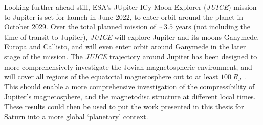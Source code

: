 Looking further ahead still, ESA's JUpiter ICy Moon Explorer (\textit{JUICE}) mission to Jupiter \citep{grasset2013} is set for launch in June 2022, to enter orbit  around the planet in October 2029. Over the total planned mission of ${\sim}3.5$ years (not including the time of  transit to Jupiter), \textit{JUICE} will explore Jupiter and its moons Ganymede, Europa and Callisto, and will even enter orbit around Ganymede in the later stage of the mission. The \textit{JUICE} trajectory around Jupiter has been designed to more comprehensively investigate the Jovian magnetospheric environment, and will cover all regions of the equatorial magnetosphere out to at least $\SI{100}{R_J}$ \citep{esa2014}. This should enable a more comprehensive investigation of the compressibility of Jupiter's magnetosphere, and the magnetodisc structure at different local times. These results could then be used to put the work presented in this thesis for Saturn into a more global `planetary' context.
%
%
%
%
%
%
%
%
%
%
%
%
%
%
%
%
%
%
%
%
%
%
%
%
%
%
%